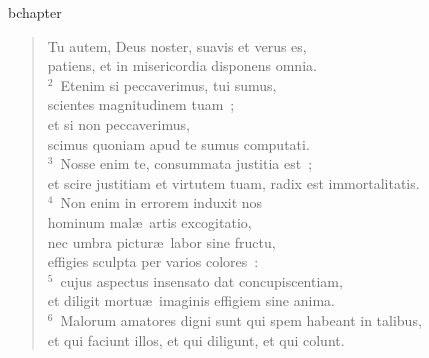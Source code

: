 bchapter\begin{verse}\vspace{-19pt}Tu autem, Deus noster, suavis et verus es,\\ patiens, et in misericordia disponens omnia.\\
${}^{2}$~Etenim si peccaverimus, tui sumus,\\ scientes magnitudinem tuam~;\\ et si non peccaverimus,\\ scimus quoniam apud te sumus computati.\\
${}^{3}$~Nosse enim te, consummata justitia est~;\\ et scire justitiam et virtutem tuam, radix est immortalitatis.\\
${}^{4}$~Non enim in errorem induxit nos\\ hominum mal\ae\ artis excogitatio,\\ nec umbra pictur\ae\ labor sine fructu,\\ effigies sculpta per varios colores~:\\
${}^{5}$~cujus aspectus insensato dat concupiscentiam,\\ et diligit mortu\ae\ imaginis effigiem sine anima.\\
${}^{6}$~Malorum amatores digni sunt qui spem habeant in talibus,\\ et qui faciunt illos, et qui diligunt, et qui colunt.\end{verse}


